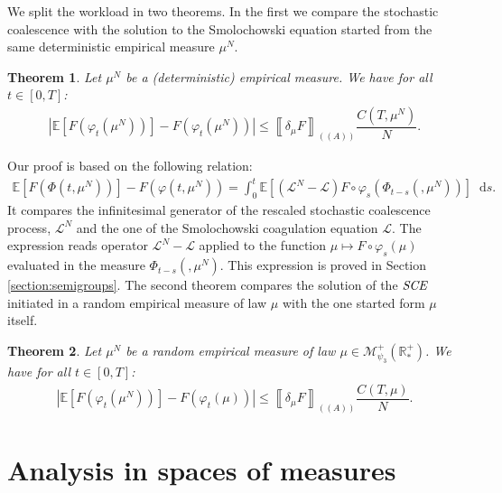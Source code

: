\documentclass[11pt,a4paper]{article}
\newcommand{\RRP}{\mathbb{R}^+_*}
\newcommand{\MC}{\mathcal{M}}
\newcommand{\LC}{\mathcal{L}}
\newcommand{\SCE}{\emph{SCE}}
\newcommand{\A}{(A)}
\newcommand{\E}[1]{\mathbb{E}\left[#1\right]}
\newcommand{\Seq}[1]{\left(#1\right)_{n\in \mathbb{N}}}
\newcommand{\dd}{\mathop{}\!\mathrm{d}}
\newtheorem{theorem}{Theorem}[section]
\begin{document}
We split the workload in two theorems. In the first we compare the stochastic coalescence with the solution to the Smolochowski equation started from the same deterministic empirical measure $\mu^N$.
\begin{theorem}\label{thm:samesame}
    Let $\mu^N$ be a (deterministic) empirical measure. We have for all $t \in [0,T]$:
    \begin{align*}
        \left| \E{F\left(\varphi_t(\mu^N)\right)} - F\left(\varphi_t(\mu^N)\right)\right| \leq \left\llbracket \delta_\mu F \right\rrbracket_{(\A)} \dfrac{C(T,\mu^N)}{N}.
    \end{align*}
\end{theorem}
Our proof is based on the following relation:
\begin{align}\label{eq:semi-group-relation}
\E{F(\Phi(t,\mu^N))} - F(\varphi\left(t,\mu^N\right)) = \int_0^t \E{\left(\LC^N - \LC\right)F\circ \varphi_s \left(\Phi_{t-s}(,\mu^N)\right)}\dd s.
\end{align}
It compares the infinitesimal generator of the rescaled stochastic coalescence process, $\LC^N$ and the one of the Smolochowski coagulation equation $\LC$. The expression reads operator $\LC^N - \LC$ applied to the function $\mu \mapsto F\circ \varphi_s(\mu)$ evaluated in the measure $\Phi_{t-s}(,\mu^N)$. This expression is proved in Section \ref{section:semigroups}. The second theorem compares the solution of the $\SCE$ initiated in a random empirical measure of law $\mu$ with the one started form $\mu$ itself.

\begin{theorem}\label{thm:difdif}
    Let $\mu^N$ be a random empirical measure of law $\mu \in \MC^+_{\psi_3}(\RRP)$. We have for all $t \in [0,T]$:
    \begin{align*}
        \left| \E{F\left(\varphi_t(\mu^N)\right)} - F\left(\varphi_t(\mu)\right)\right| \leq \left\llbracket \delta_\mu F \right\rrbracket_{(\A)}  \dfrac{C(T,\mu)}{N}.
    \end{align*}
\end{theorem}

\section{Analysis in spaces of measures}\label{section:analysis-measures}
\end{document}
